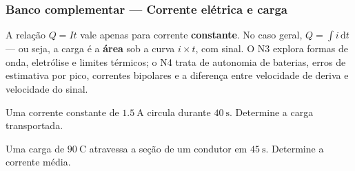 
\subsubsection*{Banco complementar --- Corrente elétrica e carga}

\begin{atencao}
A relação $Q=It$ vale apenas para corrente \textbf{constante}. No caso geral,
$Q=\int i\,\mathrm{d}t$ --- ou seja, a carga é a \textbf{área} sob a curva
$i\times t$, com sinal. O N3 explora formas de onda, eletrólise e limites
térmicos; o N4 trata de autonomia de baterias, erros de estimativa por pico,
correntes bipolares e a diferença entre velocidade de deriva e velocidade do
sinal.
\end{atencao}

\blocofixacao

\begin{questao}[1]{}
Uma corrente constante de $\SI{1.5}{\ampere}$ circula durante
$\SI{40}{\second}$. Determine a carga transportada.
\end{questao}

\begin{questao}[1]{}
Uma carga de $\SI{90}{\coulomb}$ atravessa a seção de um condutor em
$\SI{45}{\second}$. Determine a corrente média.
\end{questao}

